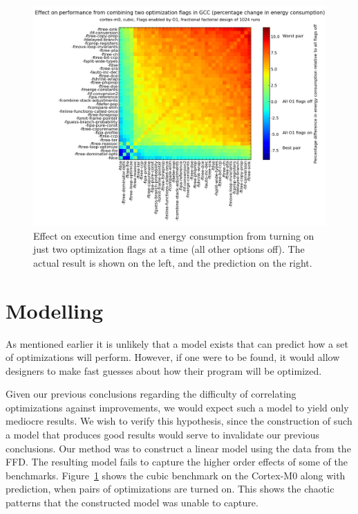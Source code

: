 \documentclass[twocolumn]{article}
\let\oldcaption\caption
\renewcommand{\caption}[1]{\oldcaption{\textup{#1}}}
\begin{document}
\begin{figure}
\begin{minipage}[l]{0.07\columnwidth}
    \end{minipage}
    \hfill
    \begin{minipage}[r]{0.95\columnwidth}
        \centering
		\includegraphics[width=0.9\linewidth, clip, trim= 8.8cm 0 7cm 2cm]{cortex-m0/o1cub_-7p5_10_pred.png}
    \end{minipage}
    \caption{Effect on execution time and energy consumption from turning on just two optimization flags at a time (all other options off). The actual result is shown on the left, and the prediction on the right.}
    \label{Fig:twoway_cubic}
\end{figure}


\section{Modelling}

As mentioned earlier it is unlikely that a model exists that can predict how a set of optimizations will perform. However, if one were to be found, it would allow designers to make fast guesses about how their program will be optimized.

Given our previous conclusions regarding the difficulty of correlating optimizations against improvements, we would expect such a model to yield only mediocre results. We wish to verify this hypothesis, since the construction of such a model that produces good results would serve to invalidate our previous conclusions. Our method was to construct a linear model using the data from the FFD. The resulting model fails to capture the higher order effects of some of the benchmarks. Figure~\ref{Fig:twoway_cubic} shows the cubic benchmark on the Cortex-M0 along with prediction, when pairs of optimizations are turned on. This shows the chaotic patterns that the constructed model was unable to capture.
\end{document}
